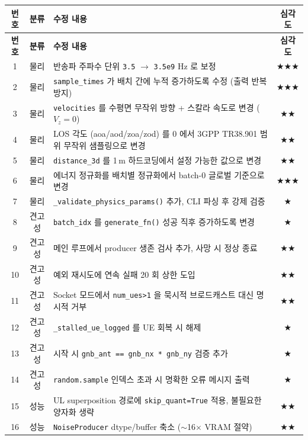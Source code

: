 \documentclass[11pt,a4paper]{article}
\newcommand{\sone}{\textcolor{starcolor}{$\bigstar$}}
\newcommand{\stwo}{\textcolor{starcolor}{$\bigstar\bigstar$}}
\newcommand{\sthree}{\textcolor{starcolor}{$\bigstar\bigstar\bigstar$}}
\begin{document}
\begin{center}
\renewcommand{\arraystretch}{1.18}
\begin{longtable}{c c p{8.6cm} c}
\toprule
\textbf{번호} & \textbf{분류} & \textbf{수정 내용} & \textbf{심각도} \\
\midrule
\endfirsthead
\toprule
\textbf{번호} & \textbf{분류} & \textbf{수정 내용} & \textbf{심각도} \\
\midrule
\endhead
\bottomrule
\endfoot

1  & 물리 & 반송파 주파수 단위 \texttt{3.5} $\to$ \texttt{3.5e9} Hz 로 보정 & \sthree \\
2  & 물리 & \texttt{sample\_times} 가 배치 간에 누적 증가하도록 수정 (출력 반복 방지) & \sthree \\
3  & 물리 & \texttt{velocities} 를 수평면 무작위 방향 + 스칼라 속도로 변경 ($V_z=0$) & \stwo \\
4  & 물리 & LOS 각도 (aoa/aod/zoa/zod) 를 0 에서 3GPP TR38.901 범위 무작위 샘플링으로 변경 & \stwo \\
5  & 물리 & \texttt{distance\_3d} 를 1\,m 하드코딩에서 설정 가능한 값으로 변경 & \stwo \\
6  & 물리 & 에너지 정규화를 배치별 정규화에서 batch-0 글로벌 기준으로 변경 & \sthree \\
7  & 물리 & \texttt{\_validate\_physics\_params()} 추가, CLI 파싱 후 강제 검증 & \sone \\
8  & 견고성 & \texttt{batch\_idx} 를 \texttt{generate\_fn()} 성공 직후 증가하도록 변경 & \sone \\
9  & 견고성 & 메인 루프에서 producer 생존 검사 추가, 사망 시 정상 종료 & \stwo \\
10 & 견고성 & 예외 재시도에 연속 실패 20 회 상한 도입 & \stwo \\
11 & 견고성 & Socket 모드에서 \texttt{num\_ues>1} 을 묵시적 브로드캐스트 대신 명시적 거부 & \stwo \\
12 & 견고성 & \texttt{\_stalled\_ue\_logged} 를 UE 회복 시 해제 & \sone \\
13 & 견고성 & 시작 시 \texttt{gnb\_ant == gnb\_nx * gnb\_ny} 검증 추가 & \sone \\
14 & 견고성 & \texttt{random.sample} 인덱스 초과 시 명확한 오류 메시지 출력 & \sone \\
15 & 성능 & UL superposition 경로에 \texttt{skip\_quant=True} 적용, 불필요한 양자화 생략 & \stwo \\
16 & 성능 & \texttt{NoiseProducer} dtype/buffer 축소 ($\sim$16$\times$ VRAM 절약) & \stwo \\

\end{longtable}
\end{center}
\end{document}
